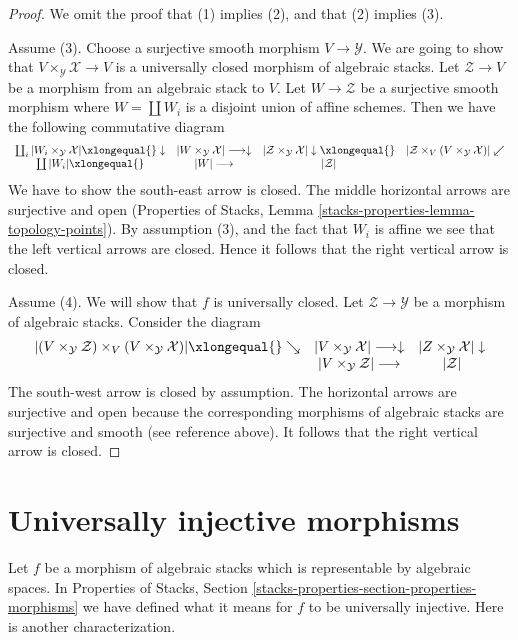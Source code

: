 \begin{proof}
We omit the proof that (1) implies (2), and that (2) implies (3).

\medskip\noindent
Assume (3). Choose a surjective smooth morphism $V \to \mathcal{Y}$.
We are going to show that $V \times_\mathcal{Y} \mathcal{X} \to V$
is a universally closed morphism of algebraic stacks.
Let $\mathcal{Z} \to V$ be a morphism from an algebraic stack to $V$.
Let $W \to \mathcal{Z}$ be a surjective smooth morphism where
$W = \coprod W_i$ is a disjoint union of affine schemes.
Then we have the following commutative diagram
$$
\begin{array}{cccc}\coprod_i |W_i \times_\mathcal{Y} \mathcal{X}| \xlongequal{}\downarrow & |W \times_\mathcal{Y} \mathcal{X}| \longrightarrow\downarrow & |\mathcal{Z} \times_\mathcal{Y} \mathcal{X}| \downarrow\xlongequal{} & |\mathcal{Z} \times_V (V \times_\mathcal{Y} \mathcal{X})| \swarrow \\ \coprod |W_i| \xlongequal{} & |W| \longrightarrow & |\mathcal{Z}| & \end{array}
$$
We have to show the south-east arrow is closed. The middle horizontal
arrows are surjective and open
(Properties of Stacks, Lemma \ref{stacks-properties-lemma-topology-points}).
By assumption (3), and the fact that
$W_i$ is affine we see that the left vertical arrows are closed. Hence
it follows that the right vertical arrow is closed.

\medskip\noindent
Assume (4). We will show that $f$ is universally closed.
Let $\mathcal{Z} \to \mathcal{Y}$ be a morphism of algebraic stacks.
Consider the diagram
$$
\begin{array}{ccc}|(V \times_\mathcal{Y} \mathcal{Z})
\times_V (V \times_\mathcal{Y} \mathcal{X})| \xlongequal{}\searrow & |V \times_\mathcal{Y} \mathcal{X}| \longrightarrow\downarrow & |Z \times_\mathcal{Y} \mathcal{X}| \downarrow \\  & |V \times_\mathcal{Y} \mathcal{Z}| \longrightarrow & |\mathcal{Z}|\end{array}
$$
The south-west arrow is closed by assumption. The horizontal arrows are
surjective and open because the corresponding morphisms of
algebraic stacks are surjective and smooth (see reference above).
It follows that the right vertical arrow is closed.
\end{proof}

\section{Universally injective morphisms}
\label{stacks-morphisms-section-universally-injective}
Let $f$ be a morphism of algebraic stacks which is representable by
algebraic spaces. In
Properties of Stacks, Section
\ref{stacks-properties-section-properties-morphisms}
we have defined what it means for $f$ to be universally injective.
Here is another characterization.

